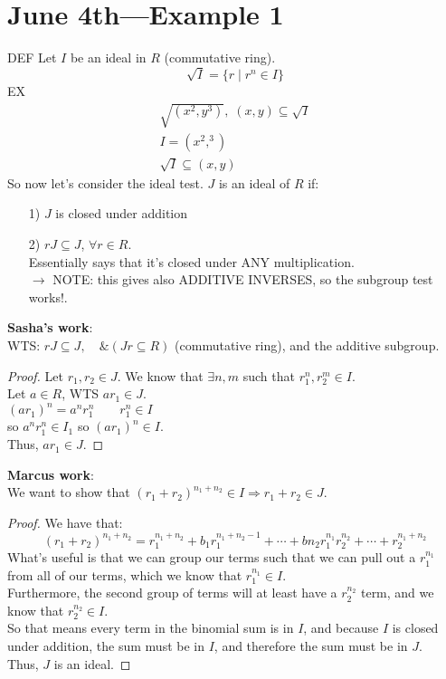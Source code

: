 \documentclass[10pt,oneisde]{book}
\newcommand{\vp}{\vspace{0.15cm}\\}
\newcommand{\vpp}{\vspace{0.25cm}\\}
\begin{document}
\section*{June 4th—Example 1}
DEF Let $I$ be an ideal in $R$ (commutative ring).
$$\sqrt I = \{r\mid r^n\in I\}$$
\color{red}
EX 
\begin{align*}
    \sqrt{(x^2,y^3)}, \; (x,y)\subseteq \sqrt I\\
    I = (x^2,^3)\\
    \sqrt I \subseteq (x,y)
\end{align*}
\color{blue}
So now let's consider the ideal test. 
$J$ is an ideal of $R$ if:
\begin{enumerate}
    \item [1)]$J$ is closed under addition
    \item [2)]$rJ\subseteq J$, $\forall r \in R$. \\
        Essentially says that it's closed under ANY multiplication.\\
        \color{darkgreen}$\rightarrow $ NOTE: this gives also ADDITIVE INVERSES, so the subgroup test works!.
\end{enumerate}
\color{sasha}
\textbf{Sasha's work}:\vpp
WTS: $rJ\subseteq J,\quad \&(Jr\subseteq R)$ (commutative ring), and the additive subgroup.
\begin{proof}
    Let $r_1,r_2\in J$. We know that $\exists n,m$ such that $r_1^n, r_2^m \in I$. \vp
    Let $a\in R$, WTS $ar_1\in J$.\vp
    $(ar_1)^n=a^nr_1^n\quad\quad r_1^n\in I$\vp
    so $a^nr_1^n \in I_1$ so $(ar_1)^n\in I$.\vp
    Thus, $ar_1\in J$.
\end{proof}
\color{marcus}
\textbf{Marcus work}:\vpp
We want to show that $(r_1+r_2)^{n_1+n_2}\in I\Rightarrow r_1+r_2\in J$.
\begin{proof}
    We have that: 
    $$(r_1+r_2)^{n_1+n_2}=r_1^{n_1+n_2}+b_1r_1^{n_1+n_2-1}+\cdots+b{n_2}r_1^{n_1}r_2^{n_2}+\cdots+r_2^{n_1+n_2}$$
    What's useful is that we can group our terms such that we can pull out a $r_1^{n_1}$ from all of our terms, which we know that $r_1^{n_1}\in I$. \vp
    Furthermore, the second group of terms will at least have a $r_2^{n_2}$ term, and we know that $r_2^{n_2}\in I$. \vp
    So that means every term in the binomial sum is in $I$, and because $I$ is closed under addition, the sum must be in $I$, and therefore the sum must be in $J$. \vp
    Thus, $J$ is an ideal. 
\end{proof}
\end{document}
